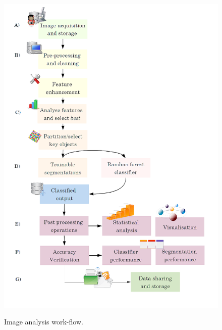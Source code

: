 \begin{figure}[!htbp]\myfloatalign \caption[Image analysis work-flow.]{Image analysis work-flow.}\label{fig:imagea_workflow}
{\includegraphics[width=1\linewidth]{gfx7/imagea_stages2}} \\ 
\end{figure}

